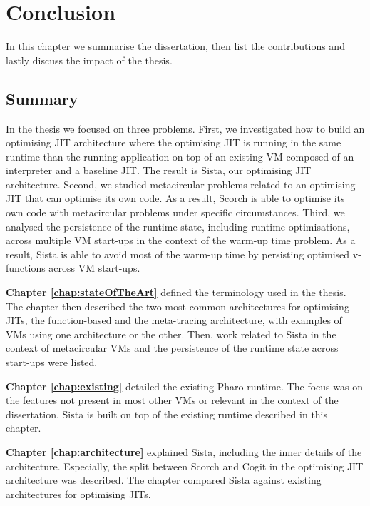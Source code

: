 \documentclass[a4paper,12pt,twoside]{../includes/ThesisStyle}
\begin{document}
\fi

\chapter{Conclusion}
\label{chap:conclusion}
\minitoc

In this chapter we summarise the dissertation, then list the contributions and lastly discuss the impact of the thesis.

\section{Summary}

In the thesis we focused on three problems. First, we investigated how to build an optimising JIT architecture where the optimising JIT is running in the same runtime than the running application on top of an existing VM composed of an interpreter and a baseline JIT. The result is Sista, our optimising JIT architecture. Second, we studied metacircular problems related to an optimising JIT that can optimise its own code. As a result, Scorch is able to optimise its own code with metacircular problems under specific circumstances. Third, we analysed the persistence of the runtime state, including runtime optimisations, across multiple VM start-ups in the context of the warm-up time problem. As a result, Sista is able to avoid most of the warm-up time by persisting optimised v-functions across VM start-ups.

\hspace{0.5cm} \textbf{Chapter \ref{chap:stateOfTheArt}} defined the terminology used in the thesis. The chapter then described the two most common architectures for optimising JITs, the function-based and the meta-tracing architecture, with examples of VMs using one architecture or the other. Then, work related to Sista in the context of metacircular VMs and the persistence of the runtime state across start-ups were listed.

\textbf{Chapter \ref{chap:existing}} detailed the existing Pharo runtime. The focus was on the features not present in most other VMs or relevant in the context of the dissertation. Sista is built on top of the existing runtime described in this chapter.

\textbf{Chapter \ref{chap:architecture}} explained Sista, including the inner details of the architecture. Especially, the split between Scorch and Cogit in the optimising JIT architecture was described. The chapter compared Sista against existing architectures for optimising JITs.
\end{document}
